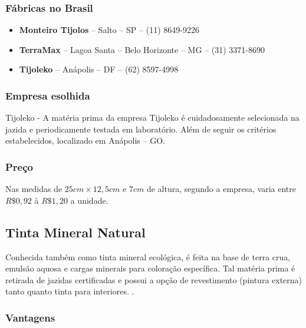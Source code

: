 \subsubsection*{\textbf{Fábricas no Brasil}}

	\begin{itemize}

		\item \textbf{Monteiro Tijolos} – Salto – SP – (11) 8649-9226

		\item \textbf{TerraMax} – Lagoa Santa – Belo Horizonte – MG – (31) 3371-8690

		\item \textbf{Tijoleko} – Anápolis – DF – (62) 8597-4998


	\end{itemize}

\subsubsection*{\textbf{Empresa esolhida}}
	
	Tijoleko - A matéria prima da empresa Tijoleko é cuidadosamente selecionada na jazida e periodicamente testada em laboratório. Além de seguir os critérios estabelecidos, localizado em Anápolis – GO.


\subsubsection*{\textbf{Preço}}

	Nas medidas de $25 cm \times 12,5 cm$ e $7 cm$ de altura, segundo a empresa, varia entre $R\$ 0,92$ à $R\$ 1,20$ a unidade.


\subsection{Tinta Mineral Natural}
	
	Conhecida também como tinta mineral ecológica, é feita na base de terra crua, emulsão aquosa e cargas minerais para coloração específica. Tal matéria prima é retirada de jazidas certificadas e possui a opção de revestimento (pintura externa) tanto quanto tinta para interiores. \cite{EcoCasa}.

\subsubsection*{\textbf{Vantagens}}
	
